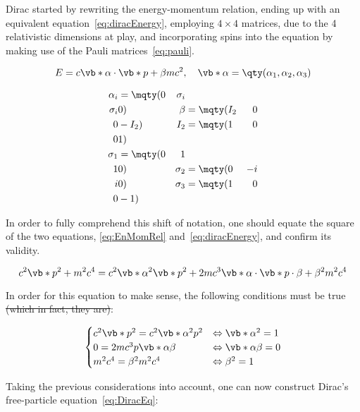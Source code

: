  Dirac started by rewriting the energy-momentum relation, ending up with an equivalent equation~\eqref{eq:diracEnergy}, employing $4\times 4$ matrices, due to the 4 relativistic dimensions at play, and incorporating spins into the equation by making use of the Pauli matrices~\eqref{eq:pauli}.

 \begin{equation}
    E=c\vb*{\alpha}\cdot \vb*{p}+{\beta} mc^2,\quad \vb*{\alpha}=\qty(\alpha_1,\alpha_2,\alpha_3)
    \label{eq:diracEnergy}
 \end{equation}

 \begin{align}
    \alpha_i&=\mqty(0 & {\sigma}_i\\ {\sigma}_i&0) & {\beta}&=\mqty(I_2 & 0 \\ 0 &-I_2) &I_2&=\mqty(1&0\\0&1)\\
    \sigma_1&=\mqty(0&1\\1&0) & \sigma_2&=\mqty(0&-i\\i&0)& \sigma_3&=\mqty(1&0\\0&-1)\label{eq:pauli}
 \end{align}

 In order to fully comprehend this shift of notation, one should equate the square of the two equations, \eqref{eq:EnMomRel} and~\eqref{eq:diracEnergy}, and confirm its validity.

 \begin{equation}
    c^2 \vb*{p}^2 + m^2c^4 = c^2\vb*{\alpha}^2\vb*{p}^2+2 m c^3 \vb*{\alpha}\cdot \vb*{p} \cdot \beta + \beta^2 m^2 c^4
 \end{equation}

 In order for this equation to make sense, the following conditions must be true \sout{(which in fact, they are)}: 

\begin{gather}
    \begin{cases}
        c^2\vb*{p}^2=c^2\vb*{\alpha}^2 p^2  &\Leftrightarrow \vb*{\alpha}^2=1\\
        0=2mc^3  p \vb*{\alpha} \beta &\Leftrightarrow \vb*{\alpha} \beta =0\\
        m^2c^4=\beta^2 m^2c^4     &\Leftrightarrow \beta^2 =1
    \end{cases}
\end{gather}


Taking the previous considerations into account, one can now construct Dirac's free-particle equation~\eqref{eq:DiracEq}:

